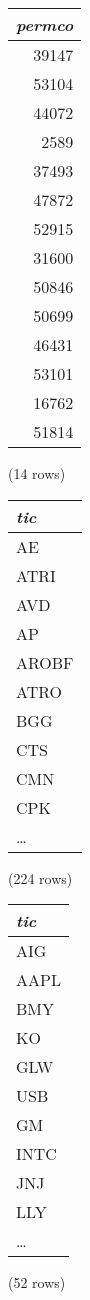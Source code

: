 \begin{center}
\begin{tabular}{r}
\textit{permco} \\
\hline
39147 \\
53104 \\
44072 \\
2589 \\
37493 \\
47872 \\
52915 \\
31600 \\
50846 \\
50699 \\
46431 \\
53101 \\
16762 \\
51814 \\
\end{tabular}

\noindent (14 rows) \\
\end{center}

\begin{center}
\begin{tabular}{l}
\textit{tic} \\
\hline
AE \\
ATRI \\
AVD \\
AP \\
AROBF \\
ATRO \\
BGG \\
CTS \\
CMN \\
CPK \\
\ldots \\
\end{tabular}

\noindent (224 rows) \\
\end{center}

\begin{center}
\begin{tabular}{l}
\textit{tic} \\
\hline
AIG \\
AAPL \\
BMY \\
KO \\
GLW \\
USB \\
GM \\
INTC \\
JNJ \\
LLY \\
\ldots \\
\end{tabular}

\noindent (52 rows) \\
\end{center}

